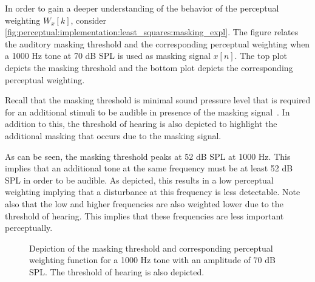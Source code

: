 In order to gain a deeper understanding of the behavior of the perceptual weighting $W_x[k]$, consider 
\autoref{fig:perceptual:implementation:least_squares:masking_expl}.
The figure relates the auditory masking threshold and the corresponding 
perceptual weighting when a 1000 Hz tone at 70 dB SPL is used as masking signal $x[n]$.
The top plot depicts the masking threshold and the bottom plot depicts the corresponding perceptual weighting.

Recall that the masking threshold is minimal sound pressure level that is required for an 
additional stimuli to be audible in presence of the masking signal~\cite{painter2000perceptual}.
In addition to this, the threshold of hearing is also depicted to highlight the additional 
masking that occurs due to the masking signal.

As can be seen, the masking threshold peaks at 52 dB SPL at 1000 Hz.
This implies that an additional tone at the same frequency must be at least 52 dB SPL in order to be audible.
As depicted, this results in a low perceptual weighting implying that a disturbance at this frequency is less detectable.
Note also that the low and higher frequencies are also weighted lower due to the threshold of hearing.
This implies that these frequencies are less important perceptually.

\begin{figure}[]
    \centering
    \scalebox{1.0}{}
    \caption{Depiction of the masking threshold and corresponding perceptual weighting 
        function for a 1000 Hz tone with an amplitude of 70 dB SPL.
        The threshold of hearing is also depicted.}
    \label{fig:perceptual:implementation:least_squares:masking_expl}
\end{figure}
